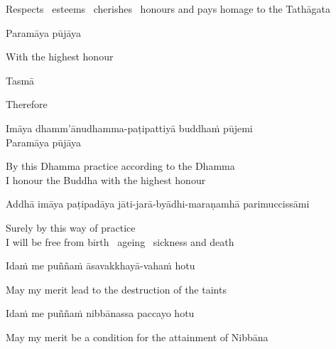 \begin{english-hang}
  Respects \breathmark\ esteems \breathmark\ cherishes \breathmark\ honours and pays homage to the Tathāgata
\end{english-hang}

Paramāya pūjāya

\begin{english}
  With the highest honour
\end{english}

\suttaRef{[DN 16]}

Tasmā

\begin{english}
  Therefore
\end{english}

Imāya dhamm'ānudhamma-paṭipattiyā buddhaṁ pūjemi\\
Paramāya pūjāya

\begin{english}
  By this Dhamma practice according to the Dhamma\\
  I honour the Buddha with the highest honour
\end{english}

\begin{pali-hang}
  Addhā imāya paṭipadāya jāti-jarā-byādhi-maraṇamhā parimuccissāmi
\end{pali-hang}

\begin{english}
  Surely by this way of practice\\
  I will be free from birth \breathmark\ ageing \breathmark\ sickness and death
\end{english}

Idaṁ me puññaṁ āsavakkhayā-vahaṁ hotu

\begin{english}
  May my merit lead to the destruction of the taints
\end{english}

Idaṁ me puññaṁ nibbānassa paccayo hotu

\begin{english}
  May my merit be a condition for the attainment of Nibbāna
\end{english}


\ifdigitalversion{}\fi

\endgroup

